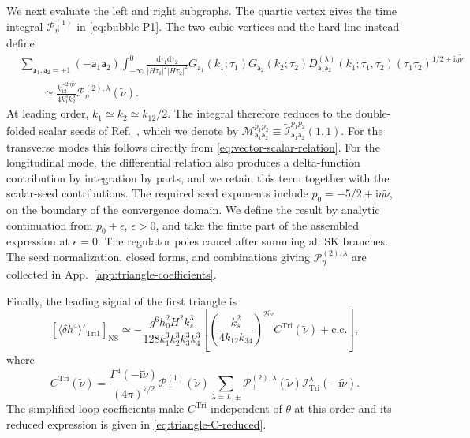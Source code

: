 \documentclass[a4paper,12pt]{article}
\def\di{{\mathrm{d}}}
\def\ii{\mathrm{i}}
\def\aa{\mathsf{a}}
\begin{document}
We next evaluate the left and right subgraphs.
The quartic vertex gives the time integral $\mathcal P^{(1)}_{\eta}$ in \eqref{eq:bubble-P1}.
The two cubic vertices and the hard line instead define
\begin{align}
    &\sum_{\aa_1,\aa_2=\pm1}(-\aa_1\aa_2)
    \int_{-\infty}^0\frac{\di\tau_1\di\tau_2}
    {|H\tau_1|^2|H\tau_2|^2}
    G_{\aa_1}(k_1;\tau_1)G_{\aa_2}(k_2;\tau_2)
    D^{(\lambda)}_{\aa_1\aa_2}(k_1;\tau_1,\tau_2)
    (\tau_1\tau_2)^{1/2+\ii\eta\tilde\nu}
    \nonumber\\
    &\qquad\simeq
    \frac{k_{12}^{-2\ii\eta\tilde\nu}}{4k_1^3k_2^3}
    \mathcal P^{(2),\lambda}_{\eta}(\tilde\nu).
    \label{eq:triangle-time-integral}
\end{align}
At leading order, $k_1\simeq k_2\simeq k_{12}/2$.
The integral therefore reduces to the double-folded scalar seeds of Ref.~\cite{qin_closed-form_2023}, which we denote by $\mathcal M_{\aa_1\aa_2}^{p_1p_2}\equiv \widetilde{\mathcal I}_{\aa_1\aa_2}^{p_1p_2}(1,1)$.
For the transverse modes this follows directly from \eqref{eq:vector-scalar-relation}.
For the longitudinal mode, the differential relation also produces a delta-function contribution by integration by parts, and we retain this term together with the scalar-seed contributions.
The required seed exponents include $p_0=-5/2+\ii\eta\tilde\nu$, on the boundary of the convergence domain.
We define the result by analytic continuation from $p_0+\epsilon$, $\epsilon>0$, and take the finite part of the assembled expression at $\epsilon=0$.
The regulator poles cancel after summing all SK branches.
The seed normalization, closed forms, and combinations giving $\mathcal P^{(2),\lambda}_{\eta}$ are collected in App.~\ref{app:triangle-coefficients}.

Finally, the leading signal of the first triangle is
\begin{equation}
    \left[\langle\delta h^4\rangle'_{\mathrm{Tri1}}\right]_{\mathrm{NS}}
    \simeq -\frac{g^6h_0^2H^2k_s^3}
    {128k_1^3k_2^3k_3^3k_4^3}
    \left[
    \left(\frac{k_s^2}{4k_{12}k_{34}}\right)^{2\ii\tilde\nu}
    C^{\mathrm{Tri}}(\tilde\nu)+\text{c.c.}\right],
    \label{eq:triangle-single-signal}
\end{equation}
where
\begin{equation}
    C^{\mathrm{Tri}}(\tilde\nu)
    =\frac{\Gamma^4(-\ii\tilde\nu)}{(4\pi)^{7/2}}
    \mathcal P^{(1)}_{+}(\tilde\nu)
    \sum_{\lambda=L,\pm}
    \mathcal P^{(2),\lambda}_{+}(\tilde\nu)
    \mathcal I^\lambda_{\mathrm{Tri}}(-\ii\tilde\nu).
    \label{eq:triangle-coefficient}
\end{equation}
The simplified loop coefficients make $C^{\mathrm{Tri}}$ independent of $\theta$ at this order and its reduced expression is given in \eqref{eq:triangle-C-reduced}.
\end{document}
